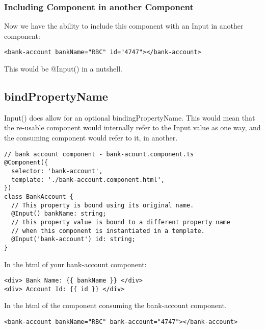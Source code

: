 
\subsubsection{ Including Component in another Component }
Now we have the ability to include this component with an Input in another
component:
\begin{lstlisting}
<bank-account bankName="RBC" id="4747"></bank-account>
\end{lstlisting}

This would be @Input() in a nutshell.

\subsection{ bindPropertyName }
Input() does allow for an optional bindingPropertyName. This would mean that
the re-usable component would internally refer to the Input value as one way,
and the consuming component would refer to it, in another.

\begin{lstlisting}
// bank account component - bank-acount.component.ts
@Component({
  selector: 'bank-account',
  template: './bank-account.component.html',
})
class BankAccount {
  // This property is bound using its original name.
  @Input() bankName: string;
  // this property value is bound to a different property name
  // when this component is instantiated in a template.
  @Input('bank-account') id: string;
}
\end{lstlisting}

In the html of your bank-account component:
\begin{lstlisting}
<div> Bank Name: {{ bankName }} </div>
<div> Account Id: {{ id }} </div>
\end{lstlisting}

In the html of the component consuming the bank-account component.
\begin{lstlisting}
<bank-account bankName="RBC" bank-account="4747"></bank-account>
\end{lstlisting}
